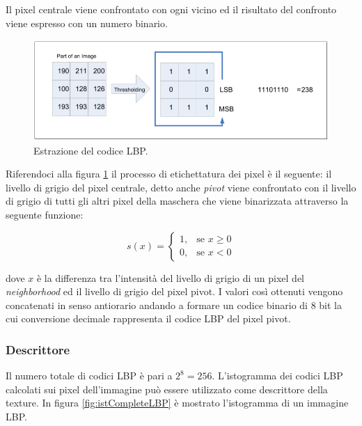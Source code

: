  Il pixel centrale viene confrontato con ogni vicino ed il risultato del confronto viene espresso con un numero binario.\\

\begin{figure}[ht]
\begin{center}
\includegraphics[width=.95\textwidth]{img/LBP_code}
\caption{ Estrazione del codice LBP.}
\label{fig:LBPcode}
\end{center}
\end{figure}

Riferendoci alla figura \ref{fig:LBPcode} il processo di etichettatura dei pixel è il seguente:
il livello di grigio del pixel centrale, detto anche \emph{pivot} viene confrontato con il livello di grigio di tutti gli altri pixel della maschera che viene binarizzata attraverso la seguente funzione:

\begin{equation}
s(x) = 	\begin{cases} 1, & \mbox{se } x \ge 0 \\ 0, & \mbox{se } x < 0 \end{cases}
\end{equation}

dove $x$ è la differenza tra l'intensità del livello di grigio di un pixel del \emph{neighborhood} ed il livello di grigio del pixel pivot. I valori così ottenuti vengono concatenati in senso antiorario andando a formare un codice binario di 8 bit la cui conversione decimale rappresenta il codice \acs{LBP} del pixel pivot.

\subsubsection*{Descrittore}
Il numero totale di codici \acs{LBP} è pari a $2^8 = 256$.
L'istogramma dei codici LBP calcolati sui pixel dell'immagine può essere utilizzato come descrittore della texture. In figura \ref{fig:istCompleteLBP} è mostrato l'istogramma di un immagine LBP.

